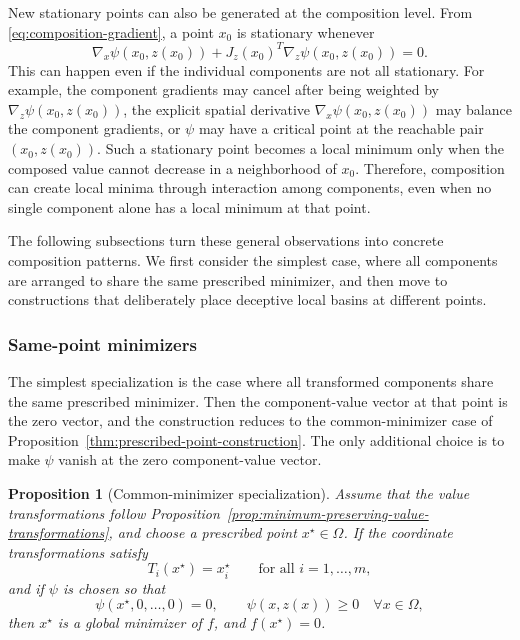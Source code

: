 \documentclass[journal]{IEEEtran}
\theoremstyle{remark}
\theoremstyle{plain}
\newtheorem{proposition}{Proposition}
\begin{document}
New stationary points can also be generated at the composition level. From
\eqref{eq:composition-gradient}, a point \(x_0\) is stationary whenever
\[
	\nabla_x\psi(x_0,z(x_0))
	+
	J_z(x_0)^T\nabla_z\psi(x_0,z(x_0))=0.
\]
This can happen even if the individual components are not all stationary. For
example, the component gradients may cancel after being weighted by
\(\nabla_z\psi(x_0,z(x_0))\), the explicit spatial derivative
\(\nabla_x\psi(x_0,z(x_0))\) may balance the component gradients, or \(\psi\)
may have a critical point at the reachable pair \((x_0,z(x_0))\). Such a
stationary point becomes a local minimum only when the composed value cannot
decrease in a neighborhood of \(x_0\). Therefore, composition can create local
minima through interaction among components, even when no single component
alone has a local minimum at that point.

The following subsections turn these general observations into concrete
composition patterns. We first consider the simplest case, where all components
are arranged to share the same prescribed minimizer, and then move to
constructions that deliberately place deceptive local basins at different
points.

\subsubsection{Same-point minimizers}

The simplest specialization is the case where all transformed components share
the same prescribed minimizer. Then the component-value vector at that point is
the zero vector, and the construction reduces to the common-minimizer case of
Proposition~\ref{thm:prescribed-point-construction}. The only additional
choice is to make \(\psi\) vanish at the zero component-value vector.

\begin{proposition}[Common-minimizer specialization]
	\label{prop:common-vanishing-construction}
	Assume that the value transformations follow
	Proposition~\ref{prop:minimum-preserving-value-transformations}, and choose
	a prescribed point \(x^\star\in\Omega\). If the coordinate transformations
	satisfy
	\[
	T_i(x^\star)=x_i^\star
	\qquad
	\text{for all }i=1,\ldots,m,
	\]
	and if \(\psi\) is chosen so that
	\[
	\psi(x^\star,0,\ldots,0)=0,
	\qquad
	\psi(x,z(x))\ge0
	\quad
	\forall x\in\Omega,
	\]
	then \(x^\star\) is a global minimizer of \(f\), and \(f(x^\star)=0\).
\end{proposition}
\end{document}
